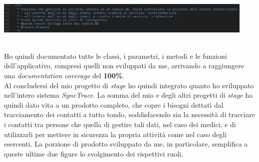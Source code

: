 \begin{minipage}{\linewidth}
  \centering
    \includegraphics[height=1.5cm]{immagini/compodocdoc}
\end{minipage} \\

Ho quindi documentato tutte le classi, i parametri, i metodi e le funzioni dell'applicativo, compresi quelli non sviluppati da me, arrivando a raggiungere una \textit{documentation coverage} del \textbf{100\%}. \\

Al concludersi del mio progetto di \textit{stage} ho quindi integrato quanto ho sviluppato nell'intero sistema \textit{SyncTrace}. La somma del mio e degli altri progetti di \textit{stage} ha quindi dato vita a un prodotto completo, che copre i bisogni dettati dal tracciamento dei contatti a tutto tondo, soddisfacendo sia la necessità di tracciare i contatti tra persone che quella di gestire tali dati, nel caso dei medici, e di utilizzarli per mettere in sicurezza la propria attività come nel caso degli esercenti. La porzione di prodotto sviluppato da me, in particolare, semplifica a queste ultime due figure lo svolgimento dei rispettivi ruoli. \\
